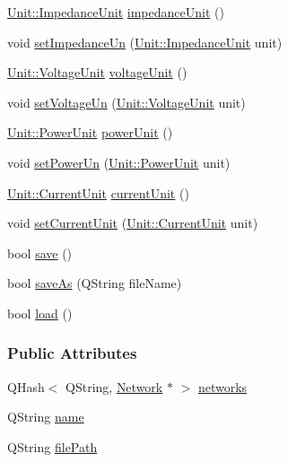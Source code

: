 \begin{DoxyCompactItemize}
\item 
\hyperlink{class_unit_a3747e779c805df24a71961290be3fbdf}{Unit\+::\+Impedance\+Unit} \hyperlink{class_project_ad0725b9aa4445dd6d21d4e15df482d3b}{impedance\+Unit} ()
\item 
void \hyperlink{class_project_a995d050781923522ae2a02728346d199}{set\+Impedance\+Un} (\hyperlink{class_unit_a3747e779c805df24a71961290be3fbdf}{Unit\+::\+Impedance\+Unit} unit)
\item 
\hyperlink{class_unit_a55b07dfa9457e1eca2c7194fe0cfc3c1}{Unit\+::\+Voltage\+Unit} \hyperlink{class_project_a93b928093072ba15c24693b03a934e4e}{voltage\+Unit} ()
\item 
void \hyperlink{class_project_aa26b488b2e93c8a8c6b4423ce07df4a1}{set\+Voltage\+Un} (\hyperlink{class_unit_a55b07dfa9457e1eca2c7194fe0cfc3c1}{Unit\+::\+Voltage\+Unit} unit)
\item 
\hyperlink{class_unit_ace265ae255370ccacfd5370337572c3b}{Unit\+::\+Power\+Unit} \hyperlink{class_project_a2a1bc35358d6189695d6e5b7dd547ffd}{power\+Unit} ()
\item 
void \hyperlink{class_project_aa46b8645d2047c1a2e8d329b9ebbc120}{set\+Power\+Un} (\hyperlink{class_unit_ace265ae255370ccacfd5370337572c3b}{Unit\+::\+Power\+Unit} unit)
\item 
\hyperlink{class_unit_a0794cf6c9682f48296dd4a5315389787}{Unit\+::\+Current\+Unit} \hyperlink{class_project_a0d22341fcc068be743b776df0a02f55e}{current\+Unit} ()
\item 
void \hyperlink{class_project_a64d9800bc3acafcfa4d3f45ee5aacc6d}{set\+Current\+Unit} (\hyperlink{class_unit_a0794cf6c9682f48296dd4a5315389787}{Unit\+::\+Current\+Unit} unit)
\item 
bool \hyperlink{class_project_a596a875bc5be73bc5b1b71b6448c1e07}{save} ()
\item 
bool \hyperlink{class_project_ad32a31d548ad38f4cbbe0f95879a68e5}{save\+As} (Q\+String file\+Name)
\item 
bool \hyperlink{class_project_a1e373892a0383371132ce68fa5f8813d}{load} ()
\end{DoxyCompactItemize}
\subsubsection*{Public Attributes}
\begin{DoxyCompactItemize}
\item 
Q\+Hash$<$ Q\+String, \hyperlink{class_network}{Network} $\ast$ $>$ \hyperlink{class_project_aa98126154cab59769a431668e6f17daf}{networks}
\item 
Q\+String \hyperlink{class_project_a82dd2d1bc38f9fd08c9a811fcaa76b38}{name}
\item 
Q\+String \hyperlink{class_project_a79f30adcefd0b72bd4ac7db724bc9531}{file\+Path}
\end{DoxyCompactItemize}


